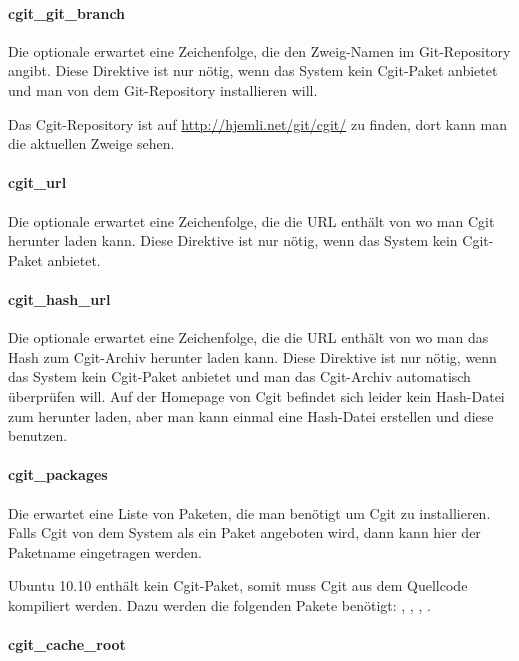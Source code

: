 \paragraph{cgit\_git\_branch}

Die optionale  erwartet eine Zeichenfolge, die den Zweig-Namen
im Git-Repository angibt. Diese Direktive ist nur nötig, wenn
das System kein Cgit-Paket anbietet und man von dem Git-Repository installieren will.

Das Cgit-Repository ist auf \url{http://hjemli.net/git/cgit/} zu finden, dort kann man
die aktuellen Zweige sehen.

\paragraph{cgit\_url}

Die optionale  erwartet eine Zeichenfolge, die die URL
enthält von wo man Cgit herunter laden kann. Diese Direktive ist nur nötig, wenn
das System kein Cgit-Paket anbietet.

\paragraph{cgit\_hash\_url}

Die optionale  erwartet eine Zeichenfolge, die die
URL enthält von wo man das Hash zum Cgit-Archiv herunter laden kann. Diese
Direktive ist nur nötig, wenn das System kein Cgit-Paket anbietet und man das
Cgit-Archiv automatisch überprüfen will. Auf der Homepage von Cgit befindet sich
leider kein Hash-Datei zum herunter laden, aber man kann einmal eine Hash-Datei
erstellen und diese benutzen.

\paragraph{cgit\_packages}

Die  erwartet eine Liste von Paketen, die man benötigt
um Cgit zu installieren. Falls Cgit von dem System als ein Paket angeboten wird,
dann kann hier der Paketname eingetragen werden.

Ubuntu 10.10 enthält kein Cgit-Paket, somit muss Cgit aus dem Quellcode
kompiliert werden. Dazu werden die folgenden Pakete benötigt:
, , , .

\paragraph{cgit\_cache\_root}

